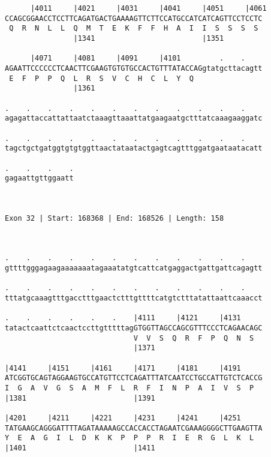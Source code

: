 \documentclass{article}
\begin{document}
\begin{Verbatim}
      |4011     |4021     |4031     |4041     |4051     |4061
CCAGCGGAACCTCCTTCAGATGACTGAAAAGTTCTTCCATGCCATCATCAGTTCCTCCTC
 Q  R  N  L  L  Q  M  T  E  K  F  F  H  A  I  I  S  S  S  S 
                |1341                         |1351         
  
      |4071     |4081     |4091     |4101         .    .    
AGAATTCCCCCCTCAACTTCGAAGTGTGTGCCACTGTTTATACCAGgtatgcttacagtt
 E  F  P  P  Q  L  R  S  V  C  H  C  L  Y  Q                
                |1361                                       
  
.    .    .    .    .    .    .    .    .    .    .    .    
agagattaccattattaatctaaagttaaattatgaagaatgctttatcaaagaaggatc
                                                            
.    .    .    .    .    .    .    .    .    .    .    .    
tagctgctgatggtgtgtggttaactataatactgagtcagtttggatgaataatacatt
                                                            
.    .    .    .
gagaattgttggaatt
                
                
 
Exon 32 | Start: 168368 | End: 168526 | Length: 158



.    .    .    .    .    .    .    .    .    .    .    .    
gttttgggagaagaaaaaaatagaaatatgtcattcatgaggactgattgattcagagtt
                                                            
.    .    .    .    .    .    .    .    .    .    .    .    
tttatgcaaagtttgacctttgaactctttgttttcatgtctttatattaattcaaacct
                                                            
.    .    .    .    .    .    |4111     |4121     |4131     
tatactcaattctcaactccttgtttttagGTGGTTAGCCAGCGTTTCCCTCAGAACAGC
                              V  V  S  Q  R  F  P  Q  N  S  
                              |1371                         
  
|4141     |4151     |4161     |4171     |4181     |4191     
ATCGGTGCAGTAGGAAGTGCCATGTTCCTCAGATTTATCAATCCTGCCATTGTCTCACCG
I  G  A  V  G  S  A  M  F  L  R  F  I  N  P  A  I  V  S  P  
|1381                         |1391                         
  
|4201     |4211     |4221     |4231     |4241     |4251     
TATGAAGCAGGGATTTTAGATAAAAAGCCACCACCTAGAATCGAAAGGGGCTTGAAGTTA
Y  E  A  G  I  L  D  K  K  P  P  P  R  I  E  R  G  L  K  L  
|1401                         |1411                         
  

\end{Verbatim}
\end{document}
